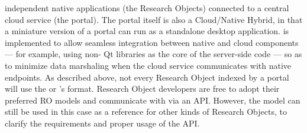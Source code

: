 \documentclass[11pt,letterpaper]{article}
\begin{document}
independent native applications (the {\RAK} 
Research Objects) connected to a central 
cloud service (the {\MOSAIC} portal).  The portal 
itself is also a Cloud/Native Hybrid, in that a 
miniature version of a {\MOSAIC} portal can run 
as a standalone desktop application.  {\lfMOSAIC} 
is implemented to allow seamless integration between 
native and cloud components --- for example, 
using non-{\GUI} Qt libraries as the core of the 
server-side code --- so as to minimize data 
marshaling when the cloud service 
communicates with native endpoints.
\p{}
As described above, not every Research Object indexed 
by a {\MOSAIC} portal will use the {\MOSAIC} {\SDK} or 
{\MOSAIC}'s {\RAK} format.  Research Object developers are 
free to adopt their preferred RO models and 
communicate with {\MOSAIC} via an API.  However, 
the {\RAK} model can still be used in this case as a 
reference for other kinds of Research Objects, 
to clarify the requirements and 
proper usage of the {\MOSAIC} API.
\p{}
\end{document}
